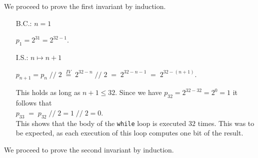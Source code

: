 We proceed to prove the first invariant by induction.  
\begin{enumerate}
\item[B.C.:] $n = 1$

             $p_1 = 2^{31} = 2^{32-1}$. 
\item[I.S.:] $n \mapsto n + 1$

   $p_{n+1} = p_n \;\mathtt{/\!/}\; 2 \;\stackrel{IV}{=}\; 2^{32-n} \;\mathtt{/\!/}\; 2 \;=\; 2^{32-n-1} \;=\; 2^{32-(n+1)}$.

   This holds as long as $n+1 \leq 32$.  Since we have $p_{32} = 2^{32-32} = 2^0 = 1$ it follows that
   \\[0.2cm]
   \hspace*{1.3cm}
   $p_{33} \;=\; p_{32} \;\mathtt{/\!/}\; 2 = 1 \;\mathtt{/\!/}\; 2 = 0$.
   \\[0.2cm]
   This shows that the body of the \texttt{while} loop is executed $32$ times.  This was to be expected, as
   each execution of this loop computes one bit of the result.
\end{enumerate}
We proceed to prove the second invariant by induction.
